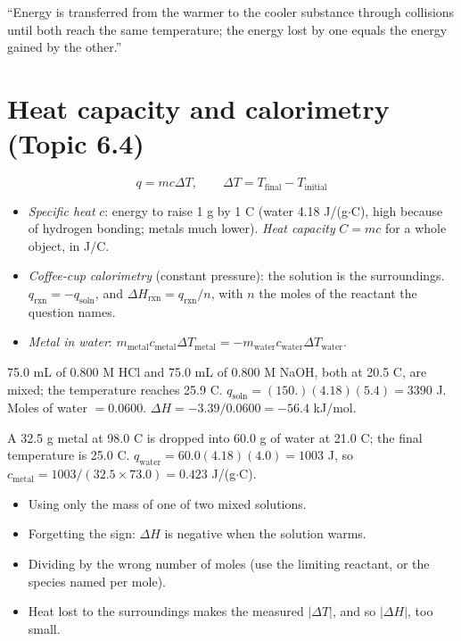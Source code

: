 \documentclass[11pt]{article}
\begin{document}
\frph ``Energy is transferred from the warmer to the cooler substance through collisions until both reach the same temperature; the energy lost by one equals the energy gained by the other.''

\section{Heat capacity and calorimetry (Topic 6.4)}\label{t:6.4}
\[ q = mc\Delta T, \qquad \Delta T = T_{\text{final}} - T_{\text{initial}} \]
\begin{itemize}
\item \emph{Specific heat} $c$: energy to raise 1 g by 1 \textdegree C (water 4.18 J/(g$\cdot$\textdegree C), high because of hydrogen bonding; metals much lower). \emph{Heat capacity} $C = mc$ for a whole object, in J/\textdegree C.
\item \emph{Coffee-cup calorimetry} (constant pressure): the solution is the surroundings. $q_{\text{rxn}} = -q_{\text{soln}}$, and $\Delta H_{\text{rxn}} = q_{\text{rxn}}/n$, with $n$ the moles of the reactant the question names.
\item \emph{Metal in water}: $m_{\text{metal}}c_{\text{metal}}\Delta T_{\text{metal}} = -m_{\text{water}}c_{\text{water}}\Delta T_{\text{water}}$.
\end{itemize}
 75.0 mL of 0.800 M HCl and 75.0 mL of 0.800 M NaOH, both at 20.5 \textdegree C, are mixed; the temperature reaches 25.9 \textdegree C. $q_{\text{soln}} = (150.)(4.18)(5.4) = 3390$ J. Moles of water $= 0.0600$. $\Delta H = -3.39/0.0600 = -56.4$ kJ/mol.

 A 32.5 g metal at 98.0 \textdegree C is dropped into 60.0 g of water at 21.0 \textdegree C; the final temperature is 25.0 \textdegree C. $q_{\text{water}} = 60.0(4.18)(4.0) = 1003$ J, so $c_{\text{metal}} = 1003/(32.5 \times 73.0) = 0.423$ J/(g$\cdot$\textdegree C).

\errorsh
\begin{itemize}
\item Using only the mass of one of two mixed solutions.
\item Forgetting the sign: $\Delta H$ is negative when the solution warms.
\item Dividing by the wrong number of moles (use the limiting reactant, or the species named per mole).
\item Heat lost to the surroundings makes the measured $|\Delta T|$, and so $|\Delta H|$, too small.
\end{itemize}
\end{document}
